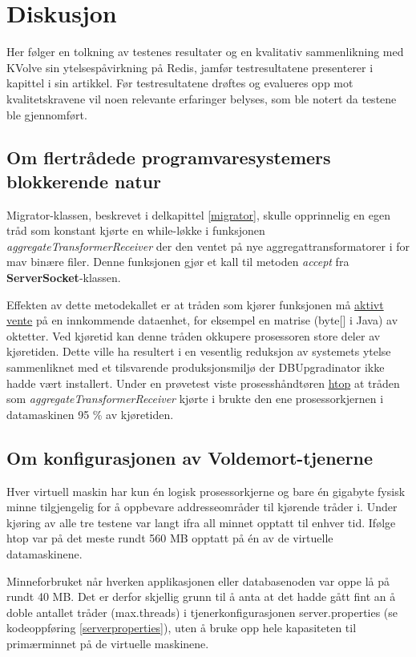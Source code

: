 \section{Diskusjon}

Her følger en tolkning av testenes resultater og en kvalitativ sammenlikning med KVolve sin ytelsespåvirkning på Redis, jamfør testresultatene \cite{saur2016} presenterer i kapittel  i sin artikkel. Før testresultatene drøftes og evalueres opp mot kvalitetskravene vil noen relevante erfaringer belyses, som ble notert da testene ble gjennomført.

\subsection{Om flertrådede programvaresystemers blokkerende natur}

Migrator-klassen, beskrevet i delkapittel \ref{migrator}, skulle opprinnelig en egen tråd som konstant kjørte en while-løkke i funksjonen \emph{aggregateTransformerReceiver} der den ventet på nye aggregattransformatorer i for mav binære filer. Denne funksjonen gjør et kall til metoden \emph{accept} fra \textbf{ServerSocket}-klassen.

Effekten av dette metodekallet er at tråden som kjører funksjonen må \underline{aktivt vente} på en innkommende dataenhet, for eksempel en matrise (byte[] i Java) av oktetter. Ved kjøretid kan denne tråden okkupere prosessoren store deler av kjøretiden. Dette ville ha resultert i en vesentlig reduksjon av systemets ytelse sammenliknet med et tilsvarende produksjonsmiljø der DBUpgradinator ikke hadde vært installert. Under en prøvetest viste prosesshåndtøren \underline{htop} at tråden som \emph{aggregateTransformerReceiver} kjørte i brukte den ene prosessorkjernen i datamaskinen 95 \% av kjøretiden.

\subsection{Om konfigurasjonen av Voldemort-tjenerne}

Hver virtuell maskin har kun én logisk prosessorkjerne og bare én gigabyte fysisk minne tilgjengelig for å oppbevare addresseområder til kjørende tråder i. Under kjøring av alle tre testene var langt ifra all minnet opptatt til enhver tid. Ifølge htop var på det meste rundt 560 MB opptatt på én av de virtuelle datamaskinene.

Minneforbruket når hverken applikasjonen eller databasenoden var oppe lå på rundt 40 MB. Det er derfor skjellig grunn til å anta at det hadde gått fint an å doble antallet tråder (max.threads) i tjenerkonfigurasjonen server.properties (se kodeoppføring \ref{serverproperties}), uten å bruke opp hele kapasiteten til primærminnet på de virtuelle maskinene.

